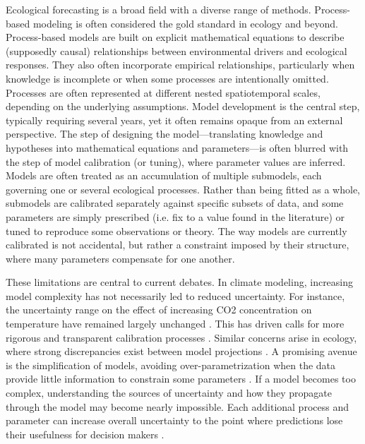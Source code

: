 \documentclass[11pt]{article}
\begin{document}
Ecological forecasting is a broad field with a diverse range of methods. Process-based modeling is often considered the gold standard in ecology \citep{Urban2016, Pilowsky2022} and beyond. Process-based models are built on explicit mathematical equations to describe (supposedly causal) relationships between environmental drivers and ecological responses. They also often incorporate empirical relationships, particularly when knowledge is incomplete or when some processes are intentionally omitted. Processes are often represented at different nested spatiotemporal scales, depending on the underlying assumptions. Model development is the central step, typically requiring several years, yet it often remains opaque from an external perspective. The step of designing the model---translating knowledge and hypotheses into mathematical equations and parameters---is often blurred with the step of model calibration (or tuning), where parameter values are inferred. Models are often treated as an accumulation of multiple submodels, each governing one or several ecological processes. Rather than being fitted as a whole, submodels are calibrated separately against specific subsets of data, and some parameters are simply prescribed (i.e. fix to a value found in the literature) or tuned to reproduce some observations or theory. The way models are currently calibrated is not accidental, but rather a constraint imposed by their structure, where many parameters compensate for one another.

These limitations are central to current debates. In climate modeling, increasing model complexity has not necessarily led to reduced uncertainty. For instance, the uncertainty range on the effect of increasing CO2 concentration on temperature have remained largely unchanged \citep{}. This has driven calls for more rigorous and transparent calibration processes \citep{balaji2022general}. Similar concerns arise in ecology, where strong discrepancies exist between model projections \citep{}. A promising avenue is the simplification of models, avoiding over-parametrization when the data provide little information to constrain some parameters \citep{Wang2017, Harrison2021}. If a model becomes too complex, understanding the sources of uncertainty and how they propagate through the model may become nearly impossible.
Each additional process and parameter can increase overall uncertainty to the point where predictions lose their usefulness for decision makers \citep{Saltelli2020}.
\end{document}

